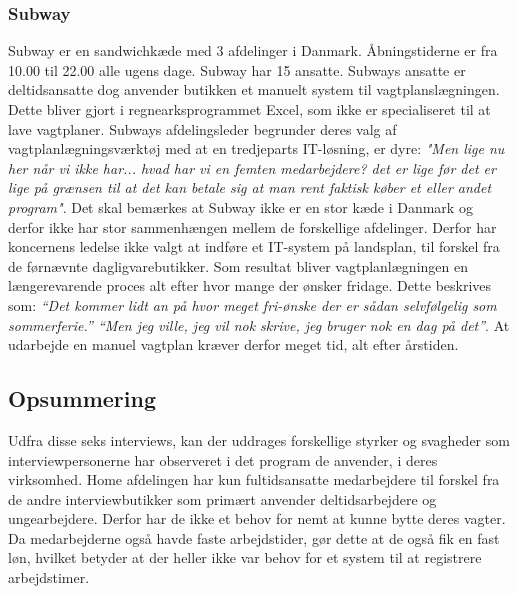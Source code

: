 \subsubsection{Subway}
Subway er en sandwichkæde med 3 afdelinger i Danmark. Åbningstiderne er fra 10.00 til 22.00 alle ugens dage. Subway har 15 ansatte. Subways ansatte er deltidsansatte dog anvender butikken et manuelt system til vagtplanslægningen. Dette bliver gjort i regnearksprogrammet Excel, som ikke er specialiseret til at lave vagtplaner. Subways afdelingsleder begrunder deres valg af vagtplanlægningsværktøj med at en tredjeparts IT-løsning, er dyre: \textit{"Men lige nu her når vi ikke har... hvad har vi en femten medarbejdere? det er lige før det er lige på grænsen til at det kan betale sig at man rent faktisk køber et eller andet program"}.
Det skal bemærkes at Subway ikke er en stor kæde i Danmark og derfor ikke har stor sammenhængen mellem de forskellige afdelinger. Derfor har koncernens ledelse ikke valgt at indføre et IT-system på landsplan, til forskel fra de førnævnte dagligvarebutikker. Som resultat bliver vagtplanlægningen en længerevarende proces alt efter hvor mange der ønsker fridage. Dette beskrives som: \textit{“Det kommer lidt an på hvor meget fri-ønske der er sådan selvfølgelig som sommerferie.” “Men jeg ville, jeg vil nok skrive, jeg bruger nok en dag på det”}. At udarbejde en manuel vagtplan kræver derfor meget tid, alt efter årstiden.

\subsection{Opsummering}
Udfra disse seks interviews, kan der uddrages forskellige styrker og svagheder som interviewpersonerne har observeret i det program de anvender, i deres virksomhed. Home afdelingen har kun fultidsansatte medarbejdere til forskel fra de andre interviewbutikker som primært anvender deltidsarbejdere og ungearbejdere. Derfor har de ikke et behov for nemt at kunne bytte deres vagter. Da medarbejderne også havde faste arbejdstider, gør dette at de også fik en fast løn, hvilket betyder at der heller ikke var behov for et system til at registrere arbejdstimer.

